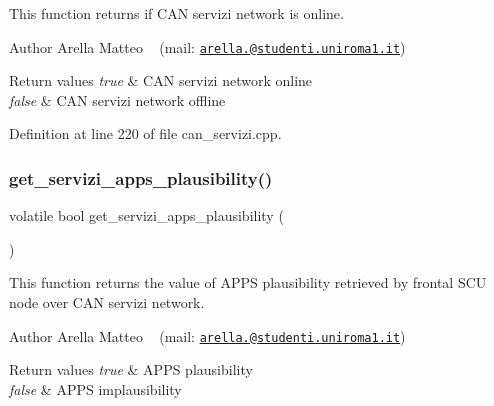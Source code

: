 This function returns if C\+AN servizi network is online. 

\begin{DoxyAuthor}{Author}
Arella Matteo ~\newline
 (mail\+: \href{mailto:arella.1646983@studenti.uniroma1.it}{\tt arella.@studenti.\+uniroma1.\+it})
\end{DoxyAuthor}

\begin{DoxyRetVals}{Return values}
{\em true} & C\+AN servizi network online \\
\hline
{\em false} & C\+AN servizi network offline \\
\hline
\end{DoxyRetVals}


Definition at line 220 of file can\+\_\+servizi.\+cpp.

\mbox{\label{group___c_a_n__servizi__group_ga66135a8978149fc6fa0b62446131ce95}} 
\subsubsection{\texorpdfstring{get\+\_\+servizi\+\_\+apps\+\_\+plausibility()}{get\_servizi\_apps\_plausibility()}}
{\footnotesize\ttfamily volatile bool get\+\_\+servizi\+\_\+apps\+\_\+plausibility (\begin{DoxyParamCaption}{ }\end{DoxyParamCaption})}



This function returns the value of A\+P\+PS plausibility retrieved by frontal S\+CU node over C\+AN servizi network. 

\begin{DoxyAuthor}{Author}
Arella Matteo ~\newline
 (mail\+: \href{mailto:arella.1646983@studenti.uniroma1.it}{\tt arella.@studenti.\+uniroma1.\+it})
\end{DoxyAuthor}

\begin{DoxyRetVals}{Return values}
{\em true} & A\+P\+PS plausibility \\
\hline
{\em false} & A\+P\+PS implausibility \\
\hline
\end{DoxyRetVals}



